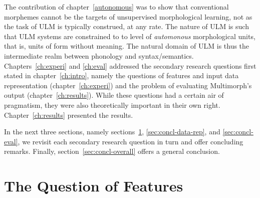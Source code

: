 The contribution of chapter~\ref{autonomous} was to show that conventional morphemes cannot be the targets of unsupervised morphological learning, not as the task of ULM is typically construed, at any rate. The nature of ULM is such that ULM systems are constrained to  %
to level of \emph{automonous} morphological units, that is, %
units of form without meaning. 
The natural domain of ULM is thus the intermediate realm between phonology and syntax/semantics. 
Chapters~\ref{ch:experi} and \ref{ch:eval} addressed the secondary research questions first stated in chapter~\ref{ch:intro}, namely the questions of features and input data representation (chapter~\ref{ch:experi}) and the problem of evaluating Multimorph's output (chapter~\ref{ch:results}). While these  questions had a certain air
of pragmatism, %
they were also theoretically important in their own right.
Chapter~\ref{ch:results} presented the results. %


In the next three sections, namely sections~\ref{sec:concl-features}, \ref{sec:concl-data-rep}, and \ref{sec:concl-eval}, we revisit each secondary research question in turn and offer concluding remarks. Finally, section~\ref{sec:concl-overall} offers a general conclusion. 

\section{The Question of Features}\label{sec:concl-features}

